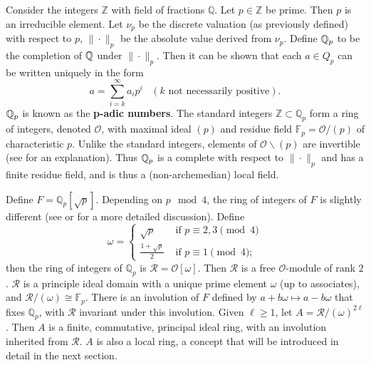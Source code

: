 \begin{example}
Consider the integers $\mathbb{Z}$ with field of fractions $\mathbb{Q}$.
Let $p \in \mathbb{Z}$ be prime.
Then $p$ is an irreducible element.
Let $\nu_p$ be the discrete valuation (as previously defined) with respect to $p$, $\| \cdot \|_p$ be the absolute value derived from $\nu_p$.
Define $\mathbb{Q}_p$ to be the completion of $\mathbb{Q}$ under $\|\cdot \|_p$.
Then it can be shown that each $a \in Q_p$ can be written uniquely in the form 
\[
a = \sum_{i=k}^\infty a_i p^i \;\;\; (k \text{ not necessarily positive}).
\]
$\mathbb{Q}_p$ is known as the \textbf{p-adic numbers}.
The standard integers $\mathbb{Z} \subset \mathbb{Q}_p$ form a ring of integers, denoted $\mathcal{O}$, 
with maximal ideal $(p)$ and residue field $\mathbb{F}_p = \mathcal{O}/(p)$ of characteristic $p$.
Unlike the standard integers, elements of $\mathcal{O} \backslash (p)$ are invertible (see \cite{katok} for an explanation).
Thus $\mathbb{Q}_p$ is a complete with respect to $\|\cdot \|_p$ and has a finite residue field, and is thus a (non-archemedian) local field.

Define $F = \mathbb{Q}_p [\sqrt{p}]$.
Depending on $p \mod 4$, the ring of integers of $F$ is slightly different (see \cite{milneANT} or \cite{samuel} for a more detailed discussion).
Define
\[
\omega = \begin{cases}
\sqrt{p} &\text{ if } p \equiv 2,3 \pmod{4}\\
\frac{1 + \sqrt{p}}{2} &\text{ if } p \equiv 1 \pmod{4};
\end{cases}
\]
then the ring of integers of $\mathbb{Q}_p$ is $\mathcal{R} = \mathcal{O}[\omega]$.
Then $\mathcal{R}$ is a free $\mathcal{O}$-module of rank $2$.
$\mathcal{R}$ is a principle ideal domain with a unique prime element $\omega$ (up to associates), and $\mathcal{R}/(\omega) \cong \mathbb{F}_p$.
There is an involution of $F$ defined by $a + b \omega \mapsto a - b \omega$ that fixes $\mathbb{Q}_p$, with $\mathcal{R}$ invariant under this involution.
Given $\ell \ge 1$, let $A = \mathcal{R} / (\omega)^{2\ell}$.
Then $A$ is a finite, commutative, principal ideal ring, with an involution inherited from $\mathcal{R}$.
$A$ is also a local ring, a concept that will be introduced in detail in the next section.
\end{example}

